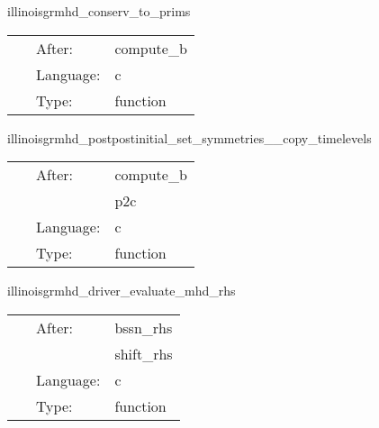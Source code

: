 \documentclass{article}
\begin{document}
\vspace{5mm}


\hspace{5mm} illinoisgrmhd\_conserv\_to\_prims 

\hspace{5mm}{\it compute primitive variables from conservatives. this is non-trivial, requiring a newton-raphson root-finder. } 


\hspace{5mm}

 \begin{tabular*}{160mm}{cll} 
~ & After:  & compute\_b \\ 
~ & Language:  & c \\ 
~ & Type:  & function \\ 
\end{tabular*} 


\vspace{5mm}


\hspace{5mm} illinoisgrmhd\_postpostinitial\_set\_symmetries\_\_copy\_timelevels 

\hspace{5mm}{\it compute post-initialdata quantities } 


\hspace{5mm}

 \begin{tabular*}{160mm}{cll} 
~ & After:  & compute\_b \\ 
~& ~ &p2c\\ 
~ & Language:  & c \\ 
~ & Type:  & function \\ 
\end{tabular*} 


\vspace{5mm}


\hspace{5mm} illinoisgrmhd\_driver\_evaluate\_mhd\_rhs 

\hspace{5mm}{\it evaluate rhss of gr hydro \& grmhd equations } 


\hspace{5mm}

 \begin{tabular*}{160mm}{cll} 
~ & After:  & bssn\_rhs \\ 
~& ~ &shift\_rhs\\ 
~ & Language:  & c \\ 
~ & Type:  & function \\ 
\end{tabular*} 
\end{document}
